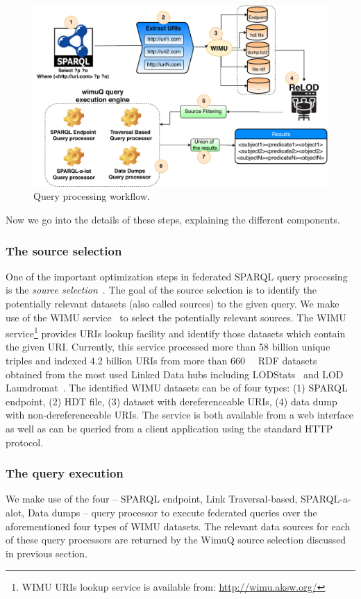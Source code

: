 \documentclass[sw]{iosart2x}
\begin{document}
\begin{figure}[htb] 
	\centering
	\includegraphics[width=0.8\linewidth]{img/wimuQ2.pdf}
	\caption{Query processing workflow.}
	\label{fig:approachWimuQ}
\end{figure}

Now we go into the details of these steps, explaining the different components.

\subsubsection{The source selection}
One of the important optimization steps in federated SPARQL query processing is the \emph{source selection}~\cite{costfed2017,hibiscus2014}. The goal of the source selection is to identify the potentially relevant datasets (also called sources) to the given query. We make use of the WIMU service~\cite{valdestilhas2018my} to select the potentially relevant sources. The WIMU service\footnote{WIMU URIs lookup service is available from: \url{http://wimu.aksw.org/}} provides URIs lookup facility and identify those datasets which contain the given URI. Currently, this service processed more than 58 billion unique triples and indexed 4.2 billion URIs from more than \SI{660}{\kilo\nothing} RDF datasets obtained from the most used Linked Data hubs including LODStats~\cite{auer2012lodstats} and LOD Laundromat~\cite{beek2014lod}. The identified WIMU datasets can be of four types: (1) SPARQL endpoint, (2) HDT file, (3) dataset with dereferenceable URIs, (4) data dump with non-dereferenceable URIs. 
The service is both available from a web interface as well as can be queried from a client application using the standard HTTP protocol.

\subsubsection{The query execution}
We make use of the four -- SPARQL endpoint, Link Traversal-based, SPARQL-a-alot, Data dumps -- query processor to execute federated queries over the aforementioned four types of WIMU datasets. The relevant data sources for each of these query processors are returned by the WimuQ source selection discussed in previous section. 
\end{document}
